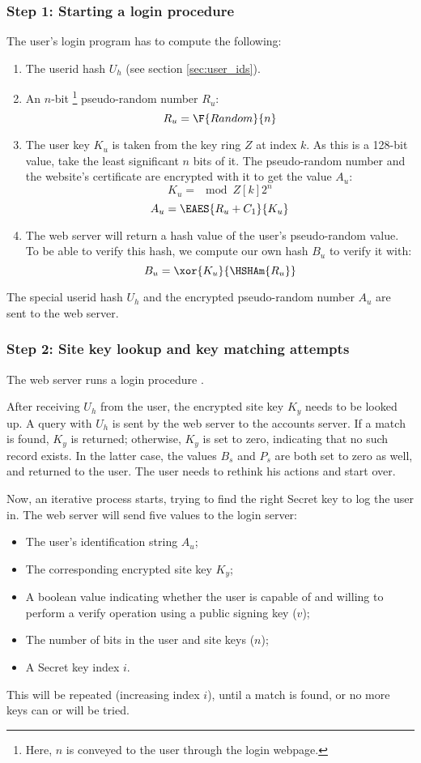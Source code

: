\subsubsection{Step 1: Starting a login procedure}
\label{sec:login_step1}
The user's login program has to compute the following:
\begin{enumerate}
\item The userid hash $U_h$ (see section \ref{sec:user_ids}).
\item An $n$-bit%
\footnote{Here, $n$ is conveyed to the user through the login webpage.}
pseudo-random number $R_u$:
\[R_u=\F{Random}{n}\]
\item The user key $K_u$ is taken from the key ring $Z$ at index $k$.
As this is a 128-bit value,
take the least significant $n$ bits of it.
The pseudo-random number and the website's certificate are encrypted with it to get the value $A_u$:
\[K_u=\mod{Z[k]}{2^n}\]
\[A_u=\EAES{R_u + C_1}{K_u}\]
\item The web server will return a hash value of the user's pseudo-random value.
To be able to verify this hash,
we compute our own hash $B_u$ to verify it with:
\[B_u=\xor{K_u}{\HSHAm{R_u}}\]
\end{enumerate}
The special userid hash $U_h$ and the encrypted pseudo-random number $A_u$ are sent to the web server.

\subsubsection{Step 2: Site key lookup and key matching attempts}
\label{sec:login_step2}
The web server runs a login procedure%
.
\par
After receiving $U_h$ from the user, the encrypted site key $K_y$ needs to be looked up.
A query with $U_h$ is sent by the web server to the accounts server.
If a match is found, $K_y$ is returned;
otherwise, $K_y$ is set to zero, indicating that no such record exists.
In the latter case, the values $B_s$ and $P_s$ are both set to zero as well, and returned to the user.
The user needs to rethink his actions and start over.
\par
Now,
an iterative process starts,
trying to find the right Secret key to log the user in.
The web server will send five values to the login server:
\begin{itemize}
\item The user's identification string $A_u$;
\item The corresponding encrypted site key $K_y$;
\item A boolean value indicating whether the user is capable of and willing to perform a verify operation using a public signing key ($v$);
\item The number of bits in the user and site keys ($n$);
\item A Secret key index $i$.
\end{itemize}
This will be repeated
(increasing index $i$),
until a match is found,
or no more keys can or will be tried.

